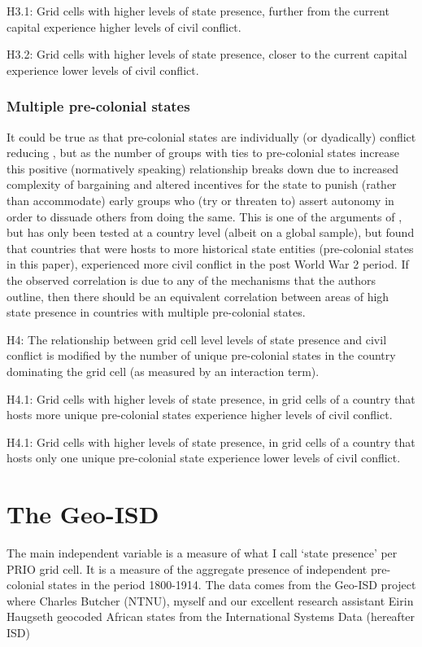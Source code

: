 \documentclass[12pt]{article}
\begin{document}
H3.1: Grid cells with higher levels of state presence, further from the current capital 
experience higher levels of civil conflict.

H3.2:  Grid cells with higher levels of state presence, closer to the current capital 
experience lower levels of civil conflict.

\subsubsection{Multiple pre-colonial states}

It could be true as that pre-colonial states are individually (or dyadically)
conflict reducing \citep{Pinker2012, Wig2016}, but as the number of groups with
ties to pre-colonial states increase this positive (normatively speaking)
relationship breaks down due to increased complexity of bargaining
\citep{Walter2009} and altered incentives for the state to punish (rather than
accommodate) early groups who (try or threaten to) assert autonomy in order to
dissuade others from doing the same. This is one of the arguments of
\citet{Wishman}, but has only been tested at a country level (albeit on a global
sample), but found that countries that were hosts to more historical state
entities (pre-colonial states in this paper), experienced more civil conflict in
the post World War 2 period. If the observed correlation is due to any of the
mechanisms that the authors outline, then there should be an equivalent
correlation between areas of high state presence in countries with multiple
pre-colonial states.

H4: The relationship between grid cell level levels of state presence and civil
conflict is modified by the number of unique pre-colonial states in the country
dominating the grid cell (as measured by an interaction term).

H4.1: Grid cells with higher levels of state presence, in grid cells of a
country that hosts more unique pre-colonial states experience higher levels of
civil conflict.

H4.1: Grid cells with higher levels of state presence, in grid cells of a
country that hosts only one unique pre-colonial state experience lower levels of
civil conflict.

\section{The Geo-ISD}

The main independent variable is a measure of what I call `state presence' per
PRIO grid cell. It is a measure of the aggregate presence of independent
pre-colonial states in the period 1800-1914. The data comes from the Geo-ISD
project where Charles Butcher (NTNU), myself and our excellent research
assistant Eirin Haugseth geocoded African states from the International Systems
Data (hereafter ISD) \citep{Griffiths2013}
\end{document}
